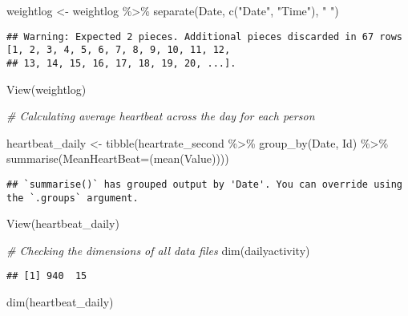 \documentclass[
]{article}
\newenvironment{Shaded}{\begin{snugshade}}{\end{snugshade}}
\newcommand{\AttributeTok}[1]{\textcolor[rgb]{0.77,0.63,0.00}{#1}}
\newcommand{\CommentTok}[1]{\textcolor[rgb]{0.56,0.35,0.01}{\textit{#1}}}
\newcommand{\FunctionTok}[1]{\textcolor[rgb]{0.00,0.00,0.00}{#1}}
\newcommand{\NormalTok}[1]{#1}
\newcommand{\OtherTok}[1]{\textcolor[rgb]{0.56,0.35,0.01}{#1}}
\newcommand{\SpecialCharTok}[1]{\textcolor[rgb]{0.00,0.00,0.00}{#1}}
\newcommand{\StringTok}[1]{\textcolor[rgb]{0.31,0.60,0.02}{#1}}
\begin{document}
\begin{Shaded}
\begin{Highlighting}[]
\NormalTok{weightlog }\OtherTok{\textless{}{-}} 
\NormalTok{  weightlog }\SpecialCharTok{\%\textgreater{}\%}
  \FunctionTok{separate}\NormalTok{(Date, }\FunctionTok{c}\NormalTok{(}\StringTok{"Date"}\NormalTok{, }\StringTok{"Time"}\NormalTok{), }\StringTok{" "}\NormalTok{)}
\end{Highlighting}
\end{Shaded}

\begin{verbatim}
## Warning: Expected 2 pieces. Additional pieces discarded in 67 rows [1, 2, 3, 4, 5, 6, 7, 8, 9, 10, 11, 12,
## 13, 14, 15, 16, 17, 18, 19, 20, ...].
\end{verbatim}

\begin{Shaded}
\begin{Highlighting}[]
\FunctionTok{View}\NormalTok{(weightlog)}


\CommentTok{\# Calculating average heartbeat across the day for each person}

\NormalTok{heartbeat\_daily }\OtherTok{\textless{}{-}} 
  \FunctionTok{tibble}\NormalTok{(heartrate\_second }\SpecialCharTok{\%\textgreater{}\%}
           \FunctionTok{group\_by}\NormalTok{(Date, Id) }\SpecialCharTok{\%\textgreater{}\%}
           \FunctionTok{summarise}\NormalTok{(}\AttributeTok{MeanHeartBeat=}\NormalTok{(}\FunctionTok{mean}\NormalTok{(Value))))}
\end{Highlighting}
\end{Shaded}

\begin{verbatim}
## `summarise()` has grouped output by 'Date'. You can override using the `.groups` argument.
\end{verbatim}

\begin{Shaded}
\begin{Highlighting}[]
\FunctionTok{View}\NormalTok{(heartbeat\_daily)}

\CommentTok{\# Checking the dimensions of all data files }
\FunctionTok{dim}\NormalTok{(dailyactivity)}
\end{Highlighting}
\end{Shaded}

\begin{verbatim}
## [1] 940  15
\end{verbatim}

\begin{Shaded}
\begin{Highlighting}[]
\FunctionTok{dim}\NormalTok{(heartbeat\_daily)}
\end{Highlighting}
\end{Shaded}
\end{document}
